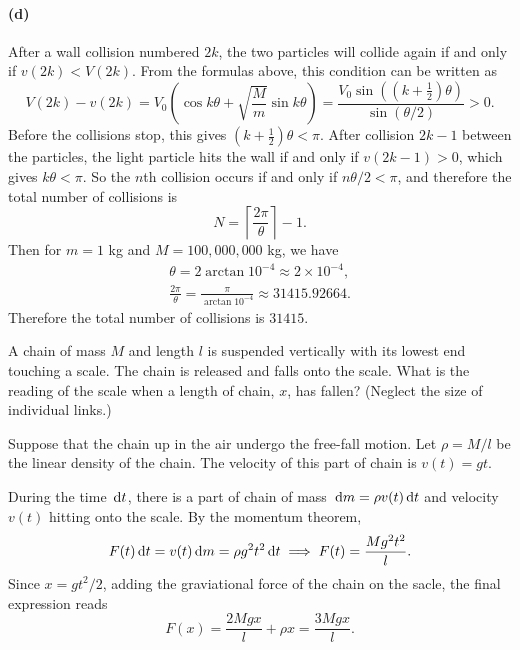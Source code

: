 \documentclass{article}
\begin{document}
\begin{solution}
	\paragraph{(d)} After a wall collision numbered $2k$, the two particles will collide again if and only if $v(2k) < V(2k)$. From the formulas above, this condition can be written as
	\[
		V(2k)-v(2k)
		= V_0\left(\cos k\theta + \sqrt{\frac{M}{m}}\sin k\theta\right)
		= \frac{V_0\sin((k+\tfrac12)\theta)}{\sin(\theta/2)} > 0.
	\]
	Before the collisions stop, this gives $(k+\tfrac12)\theta < \pi$. After collision $2k-1$ between the particles, the light particle hits the wall if and only if $v(2k-1) > 0$, which gives $k\theta < \pi$. So the $n$th collision occurs if and only if $n\theta/2 < \pi$, and therefore the total number of collisions is
	\[
		N = \left\lceil\frac{2\pi}{\theta}\right\rceil - 1.
	\]
	Then for $m = 1$ kg and $M = 100,000,000$ kg, we have
	\begin{gather*}
		\theta = 2\arctan 10^{-4} \approx 2\times 10^{-4}, \\
		\frac{2\pi}{\theta} = \frac{\pi}{\arctan 10^{-4}} \approx 31415.92664.
	\end{gather*}
	Therefore the total number of collisions is $31415$.
\end{solution}



\begin{problem}
A chain of mass $M$ and length $l$ is suspended vertically with its lowest end touching a scale. The chain is released and falls onto the scale. What is the reading of the scale when a length of chain, $x$, has fallen? (Neglect the size of individual links.)
\begin{center}
  \resizebox{0.23\linewidth}{!}{}
\end{center}
\end{problem}

\begin{solution}
	Suppose that the chain up in the air undergo the free-fall motion. Let $\rho = M/l$ be the linear density of the chain. The velocity of this part of chain is $v(t) = gt$.

	During the time $\,\mathrm{d} t$, there is a part of chain of mass $\,\mathrm{d} m = \rho v(t)\,\mathrm{d} t$ and velocity $v(t)$ hitting onto the scale. By the momentum theorem, 
	\[ F(t) \,\mathrm{d} t = v(t) \,\mathrm{d} m = \rho g^2 t^2 \,\mathrm{d} t
	\implies F(t) = \frac{Mg^2 t^2}{l}. \]
	Since $x = gt^2/2$, adding the graviational force of the chain on the sacle, the final expression reads
	\[ F(x) = \frac{2Mgx}{l}+ \rho x = \frac{3Mgx}{l}. \]
\end{solution}
\end{document}
